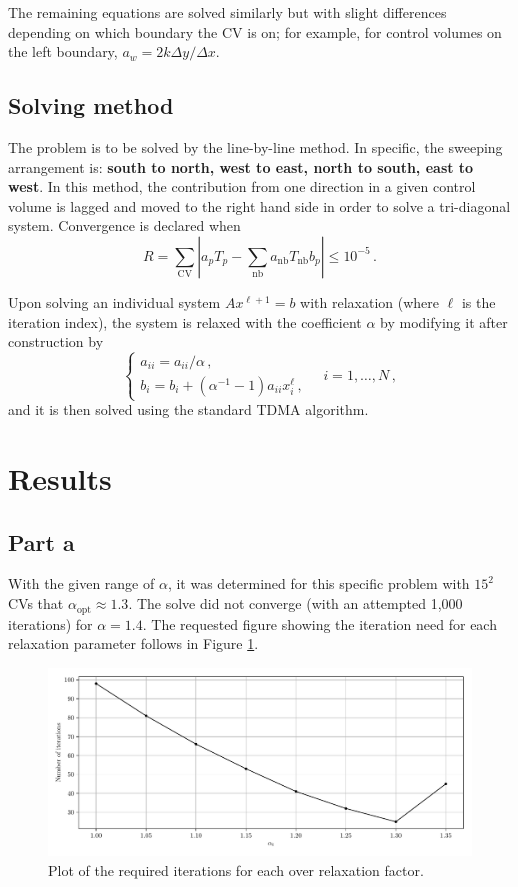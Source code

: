 \documentclass{article}
\begin{document}
The remaining equations are solved similarly but with slight differences depending on which boundary the CV is on; for example, for control volumes on the left boundary, $a_w = 2 k \Delta y / \Delta x$.

\subsection*{Solving method}

The problem is to be solved by the line-by-line method. In specific, the sweeping arrangement is: \textbf{south to north, west to east, north to south, east to west}. In this method, the contribution from one direction in a given control volume is lagged and moved to the right hand side in order to solve a tri-diagonal system. Convergence is declared when
\begin{equation}
	R = \sum_\text{CV} \left| a_p T_p - \sum_{\text{nb}} a_\text{nb} T_\text{nb} b_p\right|\leq 10^{-5}\,.
\end{equation}

Upon solving an individual system $Ax^{\ell + 1} = b$ with relaxation (where $\ell$ is the iteration index), the system is relaxed with the coefficient $\alpha$ by modifying it after construction by
\[
	\begin{cases}
		a_{ii} = a_{ii} / \alpha\,,\\
		b_i = b_i + (\alpha^{-1} - 1) a_{ii} x_i^\ell\,,
	\end{cases} \quad i = 1, \ldots, N\,,
\]
and it is then solved using the standard TDMA algorithm.

\section*{Results}

\subsection*{Part a}

With the given range of $\alpha$, it was determined for this specific problem with $15^2$ CVs that $\alpha_\text{opt} \approx 1.3$. The solve did not converge (with an attempted 1,000 iterations) for $\alpha = 1.4$. The requested figure showing the iteration need for each relaxation parameter follows in Figure \ref{fig:iterations}.

\begin{figure}[H]
	\centering
	\includegraphics[width=\linewidth]{../python/iterations}
	\caption{Plot of the required iterations for each over relaxation factor.}
	\label{fig:iterations}
\end{figure}
\end{document}
